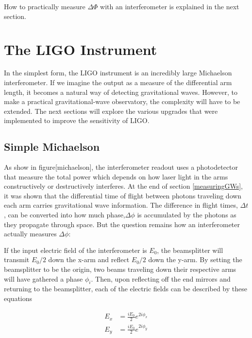 	How to practically measure $\Delta \Phi$ with an interferometer is explained in the next section.
	
	\section{The LIGO Instrument}
	In the simplest form, the LIGO instrument is an incredibly large Michaelson interferometer.  If we imagine the output as a measure of the differential arm length, it becomes a natural way of detecting gravitational waves. However, to make a practical gravitational-wave observatory, the complexity will have to be extended.  The next sections will explore the various upgrades that were implemented to improve the sensitivity of LIGO.
	
		\subsection{Simple Michaelson}
		As show in figure[michaelson], the interferometer readout uses a photodetector that measure the total power which depends on how laser light in the arms constructively or destructively interferes.  
		At the end of section \ref{measuringGWs}, it was shown that the differential time of flight between photons traveling down each arm carries gravitational wave information.  The difference in flight times, $\Delta t$, can be converted into how much phase,$\Delta \phi$ is accumulated by the photons as they propagate through space.  But the question remains how an interferometer actually measures $\Delta \phi$:
		
		If the input electric field of the interferometer is $E_0$, the beamsplitter will transmit $E_0 /2$ down the x-arm and reflect $E_0 /2$ down the y-arm.  By setting the beamsplitter to be the origin,  two beams traveling down their respective arms will have gathered a phase $\phi_i$. Then, upon reflecting off the end mirrors and returning to the beamsplitter, each of the electric fields can be described by these equations
		
			\begin{equation}
			\begin{aligned}
				E_{x} 	&=	\frac{i E_0}{2} e^{2i\phi_{x}}	
			\\	E_{y} 	&=	\frac{i E_0}{2} e^{2i\phi_{y}}
			\end{aligned}
			\end{equation}
			
